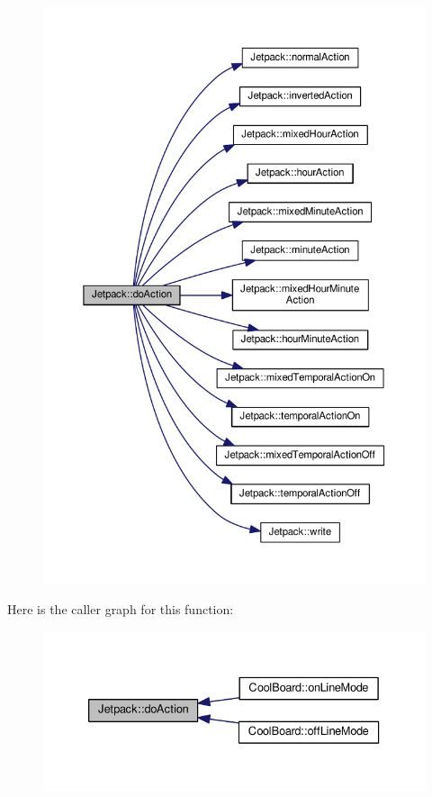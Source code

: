\begin{figure}[H]
\begin{center}
\leavevmode
\includegraphics[width=350pt]{df/d1d/class_jetpack_a9e703197093094b963f9ad57817495b8_cgraph}
\end{center}
\end{figure}
Here is the caller graph for this function\+:\nopagebreak
\begin{figure}[H]
\begin{center}
\leavevmode
\includegraphics[width=333pt]{df/d1d/class_jetpack_a9e703197093094b963f9ad57817495b8_icgraph}
\end{center}
\end{figure}
\mbox{\label{class_jetpack_acd6889af2fe5b057c6bd51b6dac827ef}} 
